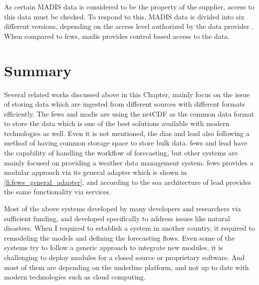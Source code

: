 As certain MADIS data is considered to be the property of the supplier, access to this data must be checked. To respond to this, MADIS data is divided into six different versions, depending on the access level authorized by the data provider \cite{Macdermaid2005ARCHITECTUREP2.39}. When compared to \acrshort{fews}, \acrshort{madis} provides control based access to the data.



\section{Summary}
\label{se:lit_summary}
Several related works discussed above in this Chapter, mainly focus on the issue of storing data which are ingested from different sources with different formats efficiently. The \acrshort{fews} and \acrshort{madis} are using the \acrshort{netCDF} as the common data format to store the data which is one of the best solutions available with modern technologies as well. Even it is not mentioned, the \acrshort{dias} and \acrshort{lead} also following a method of having common storage space to store bulk data.
\acrshort{fews} and \acrshort{lead} have the capability of handling the workflow of forecasting, but other systems are mainly focused on providing a weather data management system.
\acrshort{fews} provides a modular approach via its general adapter which is shown in \cref{fi:fews_general_adapter}, and according to the \acrshort{soa} architecture of \acrshort{lead} provides the same functionality via services.

Most of the above systems developed by many developers and researchers via sufficient funding, and developed specifically to address issues like natural disasters. When I required to establish a system in another country, it required to remodeling the models and defining the forecasting flows. Even some of the systems try to follow a generic approach to integrate new modules, it is challenging to deploy modules for a closed source or proprietary software. And most of them are depending on the underline platform, and not up to date with modern technologies such as cloud computing.
